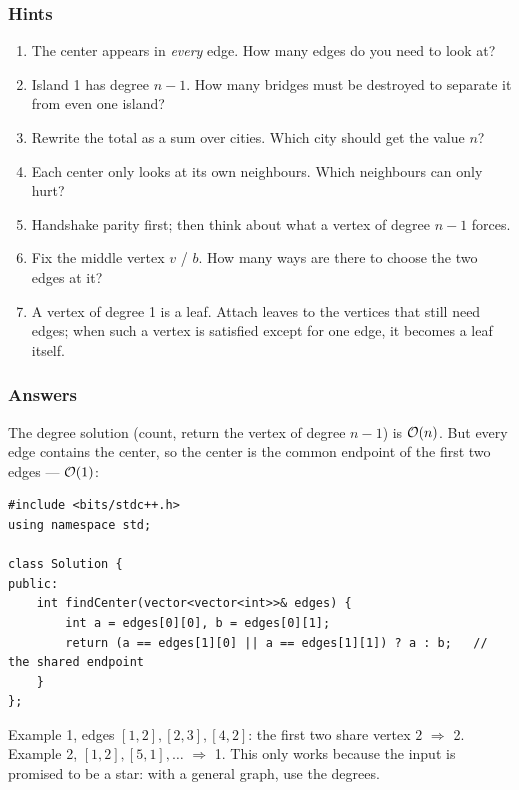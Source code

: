 \subsubsection*{Hints}
\begin{enumerate}[leftmargin=*, label=\textbf{E1.\arabic*}]
    \item The center appears in \emph{every} edge. How many edges do you need to look at?
    \item Island 1 has degree $n-1$. How many bridges must be destroyed to separate it from even one island?
    \item Rewrite the total as a sum over cities. Which city should get the value $n$?
    \item Each center only looks at its own neighbours. Which neighbours can only hurt?
    \item Handshake parity first; then think about what a vertex of degree $n-1$ forces.
    \item Fix the middle vertex $v$ / $b$. How many ways are there to choose the two edges at it?
    \item A vertex of degree 1 is a leaf. Attach leaves to the vertices that still need edges; when such a vertex is satisfied except for one edge, it becomes a leaf itself.
\end{enumerate}

\subsubsection*{Answers}

\begin{solutionbox}
The degree solution (count, return the vertex of degree $n-1$) is $\mathcal{O}(n)$. But every edge contains the center, so the center is the common endpoint of the first two edges --- $\mathcal{O}(1)$:
\begin{lstlisting}[style=cpp]
#include <bits/stdc++.h>
using namespace std;

class Solution {
public:
    int findCenter(vector<vector<int>>& edges) {
        int a = edges[0][0], b = edges[0][1];
        return (a == edges[1][0] || a == edges[1][1]) ? a : b;   // the shared endpoint
    }
};
\end{lstlisting}
Example 1, edges $[1,2],[2,3],[4,2]$: the first two share vertex $2$ $\Rightarrow$ 2. Example 2, $[1,2],[5,1],\ldots$ $\Rightarrow$ 1. This only works because the input is promised to be a star: with a general graph, use the degrees.
\end{solutionbox}

